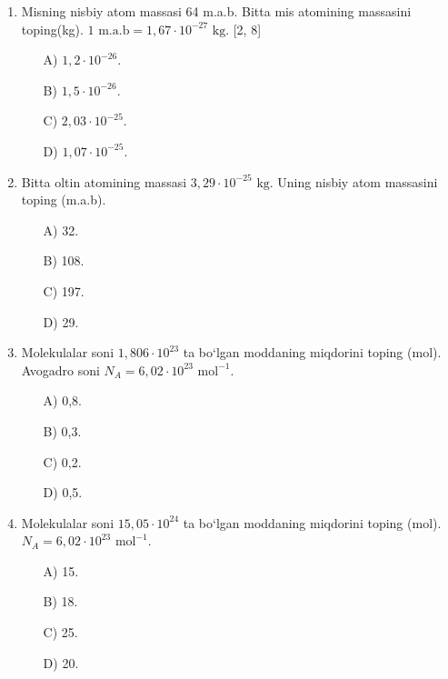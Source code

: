 \begin{enumerate}
\begin{itemize}
    \end{itemize}

    \item Misning nisbiy atom massasi 64 m.a.b. Bitta mis atomining massasini toping(kg). $1 \text{ m.a.b} = 1,67 \cdot 10^{-27} \text{ kg}$. [2, 8]
    \begin{itemize}
        \item[A)] $1,2 \cdot 10^{-26}$.
        \item[B)] $1,5 \cdot 10^{-26}$.
        \item[C)] $2,03 \cdot 10^{-25}$.
        \item[D)] $1,07 \cdot 10^{-25}$.
        
    \end{itemize}

    \item Bitta oltin atomining massasi $3,29 \cdot 10^{-25} \text{ kg}$. Uning nisbiy atom massasini toping (m.a.b).
    \begin{itemize}
        \item[A)] 32.
        \item[B)] 108.
        \item[C)] 197.
        \item[D)] 29.
        
    \end{itemize}

    \item Molekulalar soni $1,806 \cdot 10^{23}$ ta bo‘lgan moddaning miqdorini toping (mol). Avogadro soni $N_A = 6,02 \cdot 10^{23} \text{ mol}^{-1}$.
    \begin{itemize}
        \item[A)] 0,8.
        \item[B)] 0,3.
        \item[C)] 0,2.
        \item[D)] 0,5.
        
    \end{itemize}

    \item Molekulalar soni $15,05 \cdot 10^{24}$ ta bo‘lgan moddaning miqdorini toping (mol). $N_A = 6,02 \cdot 10^{23} \text{ mol}^{-1}$.
    \begin{itemize}
        \item[A)] 15.
        \item[B)] 18.
        \item[C)] 25.
        \item[D)] 20.
        

\end{itemize}
\end{enumerate}
